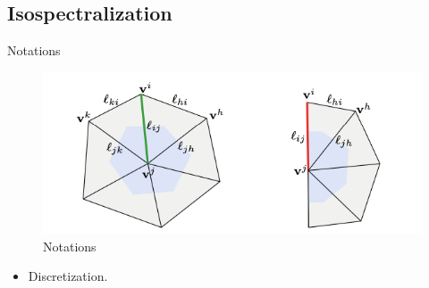 \documentclass{beamer}
\begin{document}
    
    


\subsection{Isospectralization}

\begin{frame}{Notations}
\begin{figure}
 \includegraphics[width=\textwidth]{notations}
 \caption{\label{fig:notations}Notations}
\end{figure}
\begin{itemize}
    \item Discretization.
\end{itemize}
\end{frame}
\end{document}
